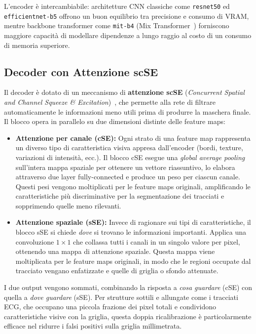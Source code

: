 L'encoder è intercambiabile: architetture CNN classiche come \texttt{resnet50} \cite{he2015deepresiduallearningimage} ed \texttt{efficientnet-b5} offrono un buon equilibrio tra precisione e consumo di VRAM, mentre backbone transformer come \texttt{mit-b4} (Mix Transformer~\cite{xie2021segformersimpleefficientdesign}) forniscono maggiore capacità di modellare dipendenze a lungo raggio al costo di un consumo di memoria superiore.

\subsection{Decoder con Attenzione scSE}

Il decoder è dotato di un meccanismo di \textbf{attenzione scSE} (\textit{Concurrent Spatial and Channel Squeeze \& Excitation})~\cite{roy2018concurrentspatialchannelsqueeze}, che permette alla rete di filtrare automaticamente le informazioni meno utili prima di produrre la maschera finale. Il blocco opera in parallelo su due dimensioni distinte delle feature maps:

\begin{itemize}
    \item \textbf{Attenzione per canale (cSE):} Ogni strato di una feature map rappresenta un diverso tipo di caratteristica visiva appresa dall'encoder (bordi, texture, variazioni di intensità, ecc.). Il blocco cSE esegue una \textit{global average pooling} sull'intera mappa spaziale per ottenere un vettore riassuntivo, lo elabora attraverso due layer fully-connected e produce un peso per ciascun canale. Questi pesi vengono moltiplicati per le feature maps originali, amplificando le caratteristiche più discriminative per la segmentazione dei tracciati e sopprimendo quelle meno rilevanti.
    \item \textbf{Attenzione spaziale (sSE):} Invece di ragionare sui tipi di caratteristiche, il blocco sSE si chiede \textit{dove} si trovano le informazioni importanti. Applica una convoluzione $1\times1$ che collassa tutti i canali in un singolo valore per pixel, ottenendo una mappa di attenzione spaziale. Questa mappa viene moltiplicata per le feature maps originali, in modo che le regioni occupate dal tracciato vengano enfatizzate e quelle di griglia o sfondo attenuate.
\end{itemize}

I due output vengono sommati, combinando la risposta a \textit{cosa guardare} (cSE) con quella a \textit{dove guardare} (sSE). Per strutture sottili e allungate come i tracciati ECG, che occupano una piccola frazione dei pixel totali e condividono caratteristiche visive con la griglia, questa doppia ricalibrazione è particolarmente efficace nel ridurre i falsi positivi sulla griglia millimetrata.

